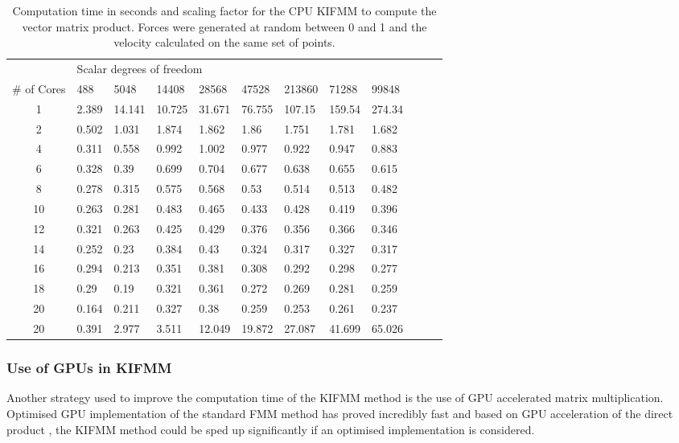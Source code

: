 \begin{table}[ht]
    \centering
    \setlength{\tabcolsep}{6pt}
    \renewcommand{\arraystretch}{1.4}
    \caption[Computation time and scaling factor for the CPU KIFMM to compute the vector matrix product.]{Computation time in seconds and scaling factor for the CPU KIFMM to compute the vector matrix product. Forces were generated at random between 0 and 1 and the velocity calculated on the same set of points.}
    \small
    \begin{tabular}{c|lllllllllll}
     & \multicolumn{8}{l}{Scalar degrees of freedom} \\ \cline{2-9}
    \# of Cores & 488 & 5048 & 14408 & 28568 & 47528 & 213860 & 71288 & 99848 \\ \hline
    1 & 2.389 & 14.141 & 10.725  & 31.671 & 76.755 & 107.15 & 159.54 & 274.34 \\ \hline
    2 & 0.502 & 1.031 & 1.874 & 1.862 & 1.86 & 1.751 & 1.781 & 1.682 \\
    4 & 0.311 & 0.558 & 0.992 & 1.002 & 0.977 & 0.922 & 0.947 & 0.883 \\
    6 & 0.328 & 0.39 & 0.699 & 0.704 & 0.677 & 0.638 & 0.655 & 0.615 \\
    8 & 0.278 & 0.315 & 0.575 & 0.568 & 0.53 & 0.514 & 0.513 & 0.482 \\
    10 & 0.263 & 0.281 & 0.483 & 0.465 & 0.433 & 0.428 & 0.419 & 0.396 \\
    12 & 0.321 & 0.263 & 0.425 & 0.429 & 0.376 & 0.356 & 0.366 & 0.346 \\
    14 & 0.252 & 0.23 & 0.384 & 0.43 & 0.324 & 0.317 & 0.327 & 0.317 \\
    16 & 0.294 & 0.213 & 0.351 & 0.381 & 0.308 & 0.292 & 0.298 & 0.277 \\
    18 & 0.29 & 0.19 & 0.321 & 0.361 & 0.272 & 0.269 & 0.281 & 0.259 \\
    20 & 0.164 & 0.211 & 0.327 & 0.38 & 0.259 & 0.253 & 0.261 & 0.237 \\ \hline
    20 & 0.391 & 2.977 & 3.511 & 12.049 & 19.872 & 27.087 & 41.699 & 65.026 \\
    \end{tabular}
    \label{tab:CPUparalisation}
\end{table}

\subsubsection{Use of GPUs in KIFMM}
Another strategy used to improve the computation time of the KIFMM method is the use of GPU accelerated matrix multiplication. Optimised GPU implementation of the standard FMM method \cite{Yokota,Hamada200942Turbulence,Wilson2021ATraversal,Kohnke2020AAccuracy} has proved incredibly fast and based on GPU acceleration of the direct product \cite{Gallagher2020}, the KIFMM method could be sped up significantly if an optimised implementation is considered.


